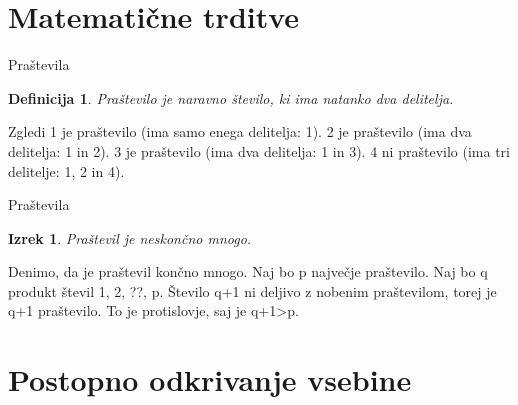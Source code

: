 \documentclass{beamer}
\newtheorem{definicija}{Definicija}
\newtheorem{izrek}{Izrek}
\begin{document}

\section{Matematične trditve}


   \begin{frame}{Praštevila}
      \begin{definicija}
      Praštevilo je naravno število, ki ima natanko dva delitelja.
      \end{definicija}
      \begin{exampleblock}{Zgledi}
         1 je praštevilo (ima samo enega delitelja: 1).
         2 je praštevilo (ima dva delitelja: 1 in 2).
         3 je praštevilo (ima dva delitelja: 1 in 3).
         4 ni praštevilo (ima tri delitelje: 1, 2 in 4).
      \end{exampleblock}
   \end{frame}

   \begin{frame}{Praštevila}
      \begin{izrek}
         Praštevil je neskončno mnogo.
      \end{izrek}
\begin{exampleblock}
         Denimo, da je praštevil končno mnogo.
         Naj bo p največje praštevilo.
         Naj bo q produkt števil 1, 2, ??, p.
         Število q+1 ni deljivo z nobenim praštevilom, torej je q+1 praštevilo.
         To je protislovje, saj je q+1>p.
         \end{exampleblock}
      
      \end{frame}

\section{Postopno odkrivanje vsebine}
\end{document}
